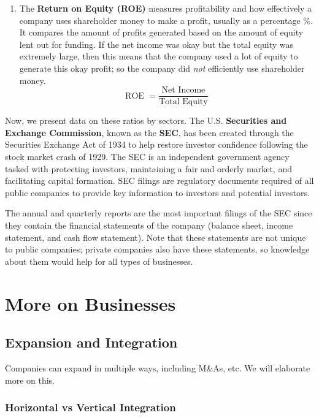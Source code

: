\documentclass{article}
\begin{document}
\begin{enumerate}
      \item The \textbf{Return on Equity (ROE)} measures profitability and how effectively a company uses shareholder money to make a profit, usually as a percentage \%. It compares the amount of profits generated based on the amount of equity lent out for funding. If the net income was okay but the total equity was extremely large, then this means that the company used a lot of equity to generate this okay profit; so the company did \textit{not} efficiently use shareholder money.
      \begin{equation}
        \text{ROE } = \frac{\text{Net Income}}{\text{Total Equity}}
      \end{equation}
    \end{enumerate}

    Now, we present data on these ratios by sectors. The U.S. \textbf{Securities and Exchange Commission}, known as the \textbf{SEC}, has been created through the Securities Exchange Act of 1934 to help restore investor confidence following the stock market crash of 1929. The SEC is an independent government agency tasked with protecting investors, maintaining a fair and orderly market, and facilitating capital formation. SEC filings are regulatory documents required of all public companies to provide key information to investors and potential investors.

    The annual and quarterly reports are the most important filings of the SEC since they contain the financial statements of the company (balance sheet, income statement, and cash flow statement). Note that these statements are not unique to public companies; private companies also have these statements, so knowledge about them would help for all types of businesses.

\section{More on Businesses}

  \subsection{Expansion and Integration}

    Companies can expand in multiple ways, including M\&As, etc. We will elaborate more on this. 

    \subsubsection{Horizontal vs Vertical Integration}
\end{document}
